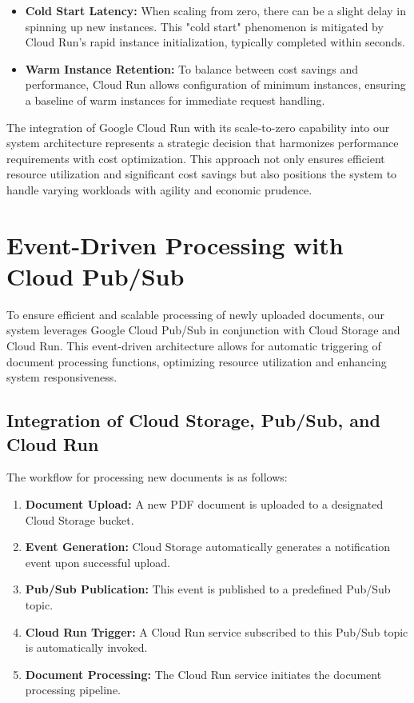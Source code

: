 \documentclass[a4paper, 12pt]{report}
\begin{document}
\begin{itemize}
    \item \textbf{Cold Start Latency:} When scaling from zero, there can be a slight delay in spinning up new instances. This "cold start" phenomenon is mitigated by Cloud Run's rapid instance initialization, typically completed within seconds.
    \item \textbf{Warm Instance Retention:} To balance between cost savings and performance, Cloud Run allows configuration of minimum instances, ensuring a baseline of warm instances for immediate request handling.
\end{itemize}

The integration of Google Cloud Run with its scale-to-zero capability into our system architecture represents a strategic decision that harmonizes performance requirements with cost optimization. This approach not only ensures efficient resource utilization and significant cost savings but also positions the system to handle varying workloads with agility and economic prudence.

\section{Event-Driven Processing with Cloud Pub/Sub}

To ensure efficient and scalable processing of newly uploaded documents, our system leverages Google Cloud Pub/Sub in conjunction with Cloud Storage and Cloud Run. This event-driven architecture allows for automatic triggering of document processing functions, optimizing resource utilization and enhancing system responsiveness.

\subsection{Integration of Cloud Storage, Pub/Sub, and Cloud Run}

The workflow for processing new documents is as follows:

\begin{enumerate}
    \item \textbf{Document Upload:} A new PDF document is uploaded to a designated Cloud Storage bucket.
    \item \textbf{Event Generation:} Cloud Storage automatically generates a notification event upon successful upload.
    \item \textbf{Pub/Sub Publication:} This event is published to a predefined Pub/Sub topic.
    \item \textbf{Cloud Run Trigger:} A Cloud Run service subscribed to this Pub/Sub topic is automatically invoked.
    \item \textbf{Document Processing:} The Cloud Run service initiates the document processing pipeline.
\end{enumerate}
\end{document}
